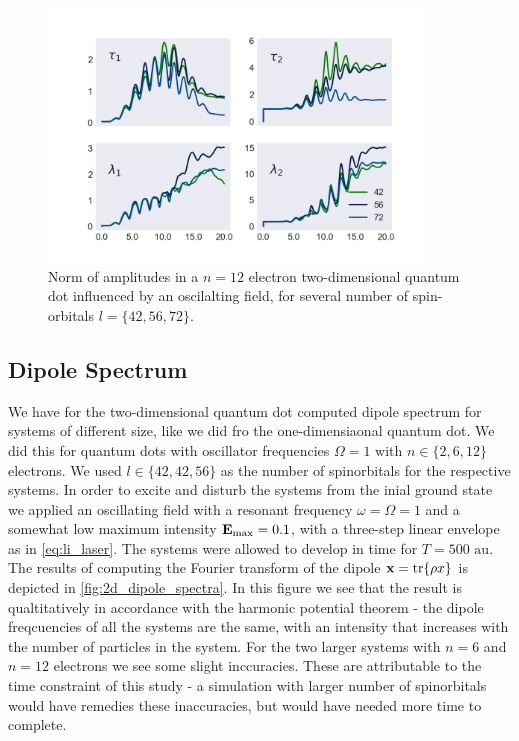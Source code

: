 \begin{figure}
    \centering
    \includegraphics[width=0.9\textwidth]{results/figures/2D/n=12_amplitudes.png}
    \caption{Norm of amplitudes in a $n=12$ electron two-dimensional quantum 
        dot influenced by an oscilalting field, for several number of 
        spin-orbitals $l=\{42,56,72\}$.
    }
    \label{fig:n12_2d_amp_norms}
\end{figure}

\subsection{Dipole Spectrum}

We have for the two-dimensional quantum dot computed dipole spectrum for systems of 
different size, like we did fro the one-dimensiaonal quantum dot. We did this for 
quantum dots with oscillator frequencies $\Omega=1$ with $n\in\{2,6,12\}$ electrons.
We used $l\in\{42,42,56\}$ as the number of spinorbitals for the respective systems.
In order to excite and disturb the systems from the inial ground state we applied 
an oscillating field with a resonant frequency $\omega=\Omega=1$ and a somewhat low 
maximum intensity $\vb{E}_\text{max}=0.1$, with a three-step linear envelope as 
in \autoref{eq:li_laser}. The systems were allowed to develop in time for 
$T = 500 \text{ au}$. The results of computing the Fourier transform of the 
dipole $\vb{x} = \tr{\rho x}$ is depicted in \autoref{fig:2d_dipole_spectra}. 
In this figure we see that the result is qualtitatively in accordance with the 
harmonic potential theorem - the dipole freqcuencies of all the systems are the 
same, with an intensity that increases with the number of particles in the system.
For the two larger systems with $n=6$ and $n=12$ electrons we see some slight 
inccuracies. These are attributable to the time constraint of this study - 
a simulation with larger number of spinorbitals would have remedies these 
inaccuracies, but would have needed more time to complete.


